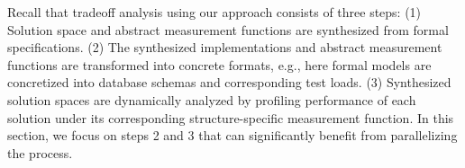\documentclass[10pt,conference]{IEEEtran}
\begin{document}





Recall that tradeoff analysis using our approach consists of three steps: (1) Solution space and abstract measurement functions are synthesized from formal specifications. (2) The synthesized implementations and abstract measurement functions are transformed into concrete formats, e.g., here formal models are concretized into database schemas and corresponding test loads. (3) Synthesized solution spaces are dynamically analyzed by profiling performance of each solution under its corresponding structure-specific measurement function. In this section, we focus on steps 2 and 3 that can significantly benefit from parallelizing the process.
\end{document}
